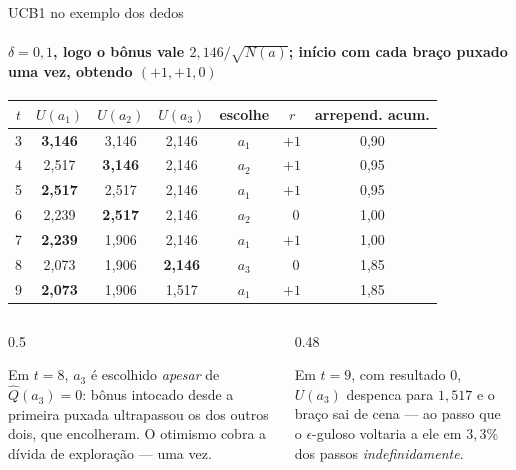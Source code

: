 \documentclass[aspectratio=169, 10pt]{beamer}
\newcommand{\Qhat}{\widehat{Q}}
\newcommand{\Nc}{N}                         %
\begin{document}
\begin{frame}{UCB1 no exemplo dos dedos}
  \framesubtitle{$\delta = 0{,}1$, logo o bônus vale $2{,}146/\sqrt{\Nc(a)}$; início com cada braço puxado uma vez, obtendo $(+1, +1, 0)$}

  \centering\scriptsize
  \begin{tabular}{ccccccc}
    \toprule
    $t$ & $U(a_1)$ & $U(a_2)$ & $U(a_3)$ & \textbf{escolhe} & $r$
      & \textbf{arrepend. acum.} \\
    \midrule
    3 & \textbf{3,146} & 3,146 & 2,146 & $a_1$ & $+1$ & 0,90 \\
    4 & 2,517 & \textbf{3,146} & 2,146 & $a_2$ & $+1$ & 0,95 \\
    5 & \textbf{2,517} & 2,517 & 2,146 & $a_1$ & $+1$ & 0,95 \\
    6 & 2,239 & \textbf{2,517} & 2,146 & $a_2$ & $\;\;0$ & 1,00 \\
    7 & \textbf{2,239} & 1,906 & 2,146 & $a_1$ & $+1$ & 1,00 \\
    8 & 2,073 & 1,906 & \textbf{2,146} & $a_3$ & $\;\;0$ & 1,85 \\
    9 & \textbf{2,073} & 1,906 & 1,517 & $a_1$ & $+1$ & 1,85 \\
    \bottomrule
  \end{tabular}

  \vspace{0.7em}
  \begin{columns}[T]
    \begin{column}{0.5\textwidth}
      \begin{ideiabox}
        Em $t = 8$, $a_3$ é escolhido \emph{apesar} de $\Qhat(a_3) = 0$:
        bônus intocado desde a primeira puxada ultrapassou os dos outros
        dois, que encolheram. O otimismo cobra a dívida de exploração ---
        uma vez.
      \end{ideiabox}
    \end{column}
    \begin{column}{0.48\textwidth}
      \begin{alertabox}
        Em $t = 9$, com resultado $0$, $U(a_3)$ despenca para $1{,}517$ e o
        braço sai de cena --- ao passo que o $\epsilon$-guloso voltaria a
        ele em $3{,}3\%$ dos passos \emph{indefinidamente}.
      \end{alertabox}
    \end{column}
  \end{columns}
\end{frame}
\end{document}
